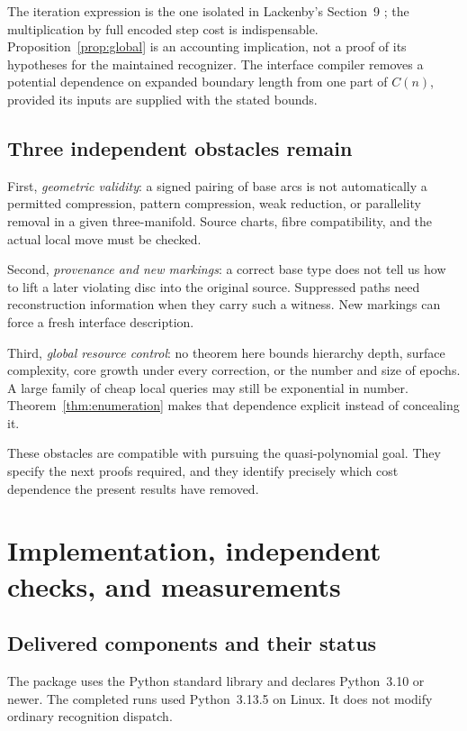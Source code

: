 \documentclass[11pt]{article}
\theoremstyle{definition}
\theoremstyle{remark}\newtheorem{remark}[theorem]{Remark}
\begin{document}
The iteration expression is the one isolated in Lackenby's Section~9 \cite{lackenby}; the multiplication by full encoded step cost is indispensable. Proposition~\ref{prop:global} is an accounting implication, not a proof of its hypotheses for the maintained recognizer. The interface compiler removes a potential dependence on expanded boundary length from one part of $C(n)$, provided its inputs are supplied with the stated bounds.

\subsection{Three independent obstacles remain}
First, \emph{geometric validity}: a signed pairing of base arcs is not automatically a permitted compression, pattern compression, weak reduction, or parallelity removal in a given three-manifold. Source charts, fibre compatibility, and the actual local move must be checked.

Second, \emph{provenance and new markings}: a correct base type does not tell us how to lift a later violating disc into the original source. Suppressed paths need reconstruction information when they carry such a witness. New markings can force a fresh interface description.

Third, \emph{global resource control}: no theorem here bounds hierarchy depth, surface complexity, core growth under every correction, or the number and size of epochs. A large family of cheap local queries may still be exponential in number. Theorem~\ref{thm:enumeration} makes that dependence explicit instead of concealing it.

These obstacles are compatible with pursuing the quasi-polynomial goal. They specify the next proofs required, and they identify precisely which cost dependence the present results have removed.

\section{Implementation, independent checks, and measurements}
\label{sec:validation}

\subsection{Delivered components and their status}
The package uses the Python standard library and declares Python~3.10 or newer. The completed runs used Python~3.13.5 on Linux. It does not modify ordinary recognition dispatch.
\end{document}
